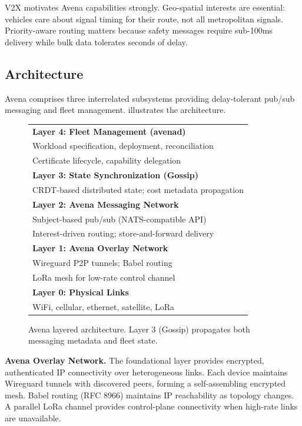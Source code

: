 \documentclass[journal]{IEEEtran}
\begin{document}
V2X motivates Avena capabilities strongly. Geo-spatial interests are essential: vehicles care about signal timing for their route, not all metropolitan signals. Priority-aware routing matters because safety messages require sub-100ms delivery while bulk data tolerates seconds of delay.

\subsection{Architecture}

Avena comprises three interrelated subsystems providing delay-tolerant pub/sub messaging and fleet management.  illustrates the architecture.

\begin{figure}[t]
\centering
\footnotesize
\begin{tabular}{|p{}|}
\hline
\textbf{Layer 4: Fleet Management (avenad)} \\
Workload specification, deployment, reconciliation \\
Certificate lifecycle, capability delegation \\
\hline
\textbf{Layer 3: State Synchronization (Gossip)} \\
CRDT-based distributed state; cost metadata propagation \\
\hline
\textbf{Layer 2: Avena Messaging Network} \\
Subject-based pub/sub (NATS-compatible API) \\
Interest-driven routing; store-and-forward delivery \\
\hline
\textbf{Layer 1: Avena Overlay Network} \\
Wireguard P2P tunnels; Babel routing \\
LoRa mesh for low-rate control channel \\
\hline
\textbf{Layer 0: Physical Links} \\
WiFi, cellular, ethernet, satellite, LoRa \\
\hline
\end{tabular}
\caption{Avena layered architecture. Layer 3 (Gossip) propagates both messaging metadata and fleet state.}
\label{fig:layers}
\end{figure}

\textbf{Avena Overlay Network.} The foundational layer provides encrypted, authenticated IP connectivity over heterogeneous links. Each device maintains Wireguard tunnels with discovered peers, forming a self-assembling encrypted mesh. Babel routing (RFC 8966) maintains IP reachability as topology changes. A parallel LoRa channel provides control-plane connectivity when high-rate links are unavailable.
\end{document}
